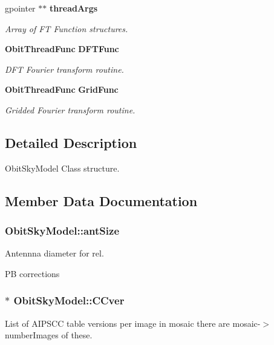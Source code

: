 \begin{CompactItemize}
gpointer $\ast$$\ast$ {\bf thread\-Args}
\begin{CompactList}\small\item\em Array of FT Function structures. \item\end{CompactList}\item 
{\bf Obit\-Thread\-Func} {\bf DFTFunc}
\begin{CompactList}\small\item\em DFT Fourier transform routine. \item\end{CompactList}\item 
{\bf Obit\-Thread\-Func} {\bf Grid\-Func}
\begin{CompactList}\small\item\em Gridded Fourier transform routine. \item\end{CompactList}\end{CompactItemize}


\subsection{Detailed Description}
Obit\-Sky\-Model Class structure. 



\subsection{Member Data Documentation}
\subsubsection{ {\bf Obit\-Sky\-Model::ant\-Size}}\label{structObitSkyModel_o27}


Antennna diameter for rel. 

PB corrections 
\subsubsection{$\ast$ {\bf Obit\-Sky\-Model::CCver}}\label{structObitSkyModel_o17}


List of AIPSCC table versions per image in mosaic there are mosaic-$>$number\-Images of these. 

